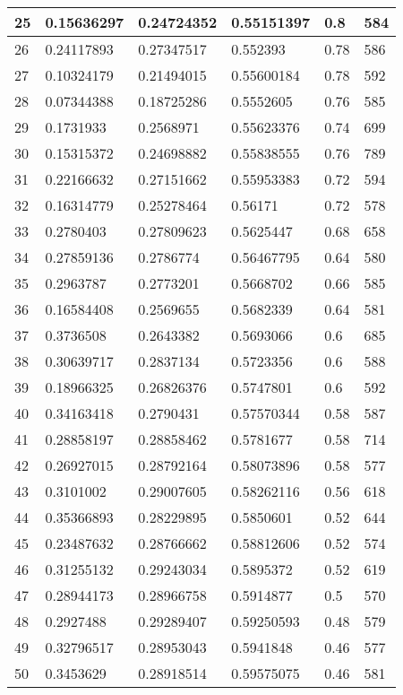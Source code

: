 \begin{longtable}{|l|l|l|l|l|l|}
25 & 0.15636297 & 0.24724352 & 0.55151397 & 0.8 & 584 \\ \hline 
26 & 0.24117893 & 0.27347517 & 0.552393 & 0.78 & 586 \\ \hline 
27 & 0.10324179 & 0.21494015 & 0.55600184 & 0.78 & 592 \\ \hline 
28 & 0.07344388 & 0.18725286 & 0.5552605 & 0.76 & 585 \\ \hline 
29 & 0.1731933 & 0.2568971 & 0.55623376 & 0.74 & 699 \\ \hline 
30 & 0.15315372 & 0.24698882 & 0.55838555 & 0.76 & 789 \\ \hline 
31 & 0.22166632 & 0.27151662 & 0.55953383 & 0.72 & 594 \\ \hline 
32 & 0.16314779 & 0.25278464 & 0.56171 & 0.72 & 578 \\ \hline 
33 & 0.2780403 & 0.27809623 & 0.5625447 & 0.68 & 658 \\ \hline 
34 & 0.27859136 & 0.2786774 & 0.56467795 & 0.64 & 580 \\ \hline 
35 & 0.2963787 & 0.2773201 & 0.5668702 & 0.66 & 585 \\ \hline 
36 & 0.16584408 & 0.2569655 & 0.5682339 & 0.64 & 581 \\ \hline 
37 & 0.3736508 & 0.2643382 & 0.5693066 & 0.6 & 685 \\ \hline 
38 & 0.30639717 & 0.2837134 & 0.5723356 & 0.6 & 588 \\ \hline 
39 & 0.18966325 & 0.26826376 & 0.5747801 & 0.6 & 592 \\ \hline 
40 & 0.34163418 & 0.2790431 & 0.57570344 & 0.58 & 587 \\ \hline 
41 & 0.28858197 & 0.28858462 & 0.5781677 & 0.58 & 714 \\ \hline 
42 & 0.26927015 & 0.28792164 & 0.58073896 & 0.58 & 577 \\ \hline 
43 & 0.3101002 & 0.29007605 & 0.58262116 & 0.56 & 618 \\ \hline 
44 & 0.35366893 & 0.28229895 & 0.5850601 & 0.52 & 644 \\ \hline 
45 & 0.23487632 & 0.28766662 & 0.58812606 & 0.52 & 574 \\ \hline 
46 & 0.31255132 & 0.29243034 & 0.5895372 & 0.52 & 619 \\ \hline 
47 & 0.28944173 & 0.28966758 & 0.5914877 & 0.5 & 570 \\ \hline 
48 & 0.2927488 & 0.29289407 & 0.59250593 & 0.48 & 579 \\ \hline 
49 & 0.32796517 & 0.28953043 & 0.5941848 & 0.46 & 577 \\ \hline 
50 & 0.3453629 & 0.28918514 & 0.59575075 & 0.46 & 581 \\ \hline 
\end{longtable}
